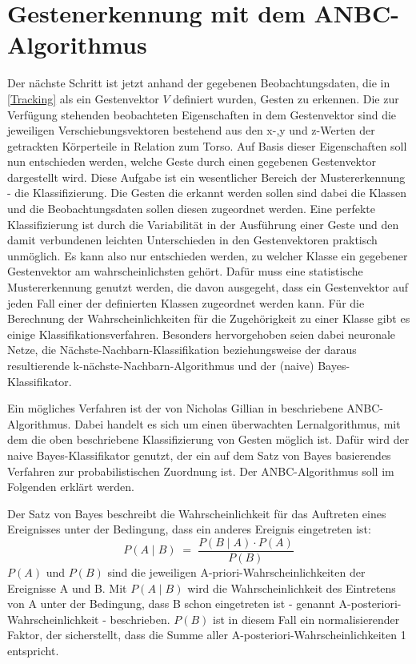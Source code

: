 \section{Gestenerkennung mit dem ANBC-Algorithmus}
Der nächste Schritt ist jetzt anhand der gegebenen Beobachtungsdaten, die in \ref{Tracking} als ein Gestenvektor $V$ definiert wurden, Gesten zu erkennen. Die zur Verfügung stehenden beobachteten Eigenschaften in dem Gestenvektor sind die jeweiligen Verschiebungsvektoren bestehend aus den x-,y und z-Werten der getrackten Körperteile in Relation zum Torso. Auf Basis dieser Eigenschaften soll nun entschieden werden, welche Geste durch einen gegebenen Gestenvektor dargestellt wird. Diese Aufgabe ist ein wesentlicher Bereich der Mustererkennung - die Klassifizierung. Die Gesten die erkannt werden sollen sind dabei die Klassen und die Beobachtungsdaten sollen diesen zugeordnet werden. Eine perfekte Klassifizierung ist durch die Variabilität in der Ausführung einer Geste und den damit verbundenen leichten Unterschieden in den Gestenvektoren praktisch unmöglich. Es kann also nur entschieden werden, zu welcher Klasse ein gegebener Gestenvektor am wahrscheinlichsten gehört. Dafür muss eine statistische Mustererkennung genutzt werden, die davon ausgegeht, dass ein Gestenvektor auf jeden Fall einer der definierten Klassen zugeordnet werden kann. Für die Berechnung der Wahrscheinlichkeiten für die Zugehörigkeit zu einer Klasse gibt es einige Klassifikationsverfahren. Besonders hervorgehoben seien dabei neuronale Netze, die Nächste-Nachbarn-Klassifikation beziehungsweise der daraus resultierende k-nächste-Nachbarn-Algorithmus \cite{nearestNeighbor} und der (naive) Bayes-Klassifikator.~\cite{patternClassification1, patternRecognitionTheory}

Ein mögliches Verfahren ist der von Nicholas Gillian in \cite{gillianANBC} beschriebene ANBC-Algorithmus. Dabei handelt es sich um einen überwachten Lernalgorithmus, mit dem die oben beschriebene Klassifizierung von Gesten möglich ist. Dafür wird der naive Bayes-Klassifikator genutzt, der ein auf dem Satz von Bayes basierendes Verfahren zur probabilistischen Zuordnung ist. Der ANBC-Algorithmus soll im Folgenden erklärt werden.

Der Satz von Bayes beschreibt die Wahrscheinlichkeit für das Auftreten eines Ereignisses unter der Bedingung, dass ein anderes Ereignis eingetreten ist:
\begin{equation}
    P(A\mid B) \; = \; \frac {P(B\mid A) \cdot P(A)} {P(B)}
\end{equation}
$P(A)$ und $P(B)$ sind die jeweiligen A-priori-Wahrscheinlichkeiten der Ereignisse A und B. Mit $P(A\mid B)$ wird die Wahrscheinlichkeit des Eintretens von A unter der Bedingung, dass B schon eingetreten ist - genannt A-posteriori-Wahrscheinlichkeit - beschrieben. $P(B)$ ist in diesem Fall ein normalisierender Faktor, der sicherstellt, dass die Summe aller A-posteriori-Wahrscheinlichkeiten 1 entspricht.

